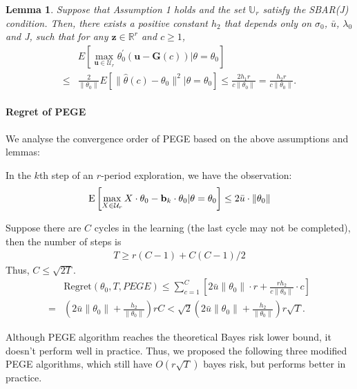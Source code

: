 \documentclass{article}
\newtheorem{lemma}[theorem]{Lemma}
\theoremstyle{plain}
\theoremstyle{definition}
\begin{document}
\begin{lemma}
Suppose that Assumption 1 holds and the set $\mathbb{U}_{r}$ satisfy the SBAR(J) condition. Then, there exists a positive constant $h_{2}$ that depends only on $\sigma_{0}$, $\bar{u}$, $\lambda_{0}$ and J, such that for any $\textbf{z}\in \mathbb{R}^{r}$ and $c\geq 1$,
\begin{align}
&E \left[ \max_{\textbf{u}\in \mathcal{U}_{r}} \theta_{0}^{'}(\textbf{u}-\textbf{G}(c))|\theta=\theta_{0}\right] \nonumber \\
\leq & \frac{2}{\|\theta_0\|}E\left[\|\hat{\theta}(c)-\theta_{0}\|^{2}|\theta=\theta_{0}\right]\leq
\frac{2h_{1}r}{c\|\theta_{0}\|} =\frac{h_2r}{c\|\theta_0\|}.
\end{align}
\end{lemma}


\paragraph{Regret of PEGE}
We analyse the convergence order of PEGE based on the above assumptions and lemmas:

In the $k$th step of an $r$-period exploration, we have the observation:
\[\text{E}\left[\max_{X\in\mathcal{U}_r} X\cdot \theta_0 - \bold{b}_k\cdot\theta_0 | \theta = \theta_0\right]\leq 2\bar{u}\cdot\|\theta_0\|\]


Suppose there are $C$ cycles in the learning (the last cycle may not be completed), then the number of steps is
\begin{align}
T \geq r(C-1) + {C(C-1)}/{2}\label{TC:PEGE}
\end{align}
Thus, $C\leq \sqrt{2T}$.
\begin{align}
&\text{Regret}(\theta_0, T, PEGE)\leq  \sum_{c=1}^{C}\left[2\bar{u}\|\theta_0\| \cdot r + \frac{rh_2}{c\|\theta_0\|}\cdot c\right] \nonumber\\
= & (2\bar{u}\|\theta_0\|+\frac{h_2}{\|\theta_0\|})rC
<  \sqrt{2}(2\bar{u}\|\theta_0\|+\frac{h_2}{\|\theta_0\|})r\sqrt{T}. \label{reg:PEGE}
\end{align}

Although PEGE algorithm reaches the theoretical Bayes risk lower bound, it doesn't perform well in practice. Thus, we proposed the following three modified PEGE algorithms, which still have $O(r\sqrt{T})$ bayes risk, but performs better in practice.

\end{document}
